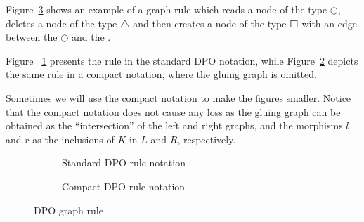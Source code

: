 \begin{example} Figure~\ref{fig:gts:rule} shows an example of a graph rule which reads a node of the type $\Circle$, deletes a node of the type $\triangle$ and then creates a node of the type $\Square$ with an edge between the $\Circle$ and the \Square. 
  
Figure ~\ref{fig:gts:rule-standard} presents the rule in the standard DPO notation, while Figure~\ref{fig:gts:rule-compact} depicts the same rule in a compact notation, where the gluing graph is omitted. 

Sometimes we will use the compact notation to make the figures smaller. Notice that the compact notation does not cause any loss as the gluing graph can be obtained as the ``intersection'' of the left and right graphs, and the morphisms $l$ and $r$ as the inclusions of $K$ in $L$ and $R$, respectively.

\begin{figure}[!ht]
  \centering
  \begin{subfigure}[t]{.5\textwidth}
    \centerline{}
    \caption{Standard DPO rule notation}\label{fig:gts:rule-standard}
  \end{subfigure}

  \begin{subfigure}[t]{.5\textwidth}
    \centerline{}
    \caption{Compact DPO rule notation}\label{fig:gts:rule-compact}
  \end{subfigure}
  \caption{DPO graph rule}\label{fig:gts:rule}
\end{figure}
\end{example}

